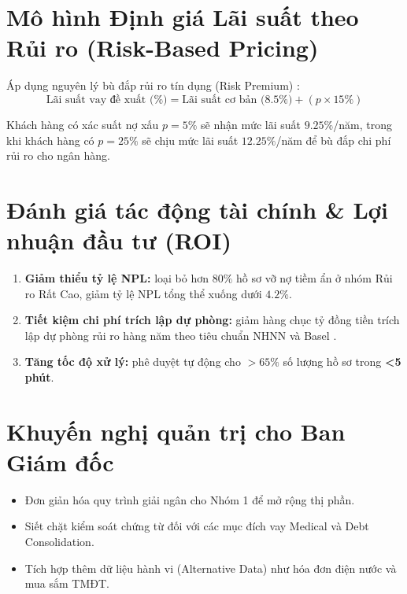 \section{Mô hình Định giá Lãi suất theo Rủi ro (Risk-Based Pricing)}
Áp dụng nguyên lý bù đắp rủi ro tín dụng (Risk Premium) \cite{arminger1997}:
$$\text{Lãi suất vay đề xuất (\%)} = \text{Lãi suất cơ bản (8.5\%)} + (p \times 15\%)$$

Khách hàng có xác suất nợ xấu $p = 5\%$ sẽ nhận mức lãi suất $9.25\%$/năm, trong khi khách hàng có $p = 25\%$ sẽ chịu mức lãi suất $12.25\%$/năm để bù đắp chi phí rủi ro cho ngân hàng.

\section{Đánh giá tác động tài chính \& Lợi nhuận đầu tư (ROI)}
\begin{enumerate}
    \item \textbf{Giảm thiểu tỷ lệ NPL:} loại bỏ hơn $80\%$ hồ sơ vỡ nợ tiềm ẩn ở nhóm Rủi ro Rất Cao, giảm tỷ lệ NPL tổng thể xuống dưới \textbf{$4.2\%$}.
    \item \textbf{Tiết kiệm chi phí trích lập dự phòng:} giảm hàng chục tỷ đồng tiền trích lập dự phòng rủi ro hàng năm theo tiêu chuẩn NHNN và Basel \cite{basel2017}.
    \item \textbf{Tăng tốc độ xử lý:} phê duyệt tự động cho $>65\%$ số lượng hồ sơ trong \textbf{<5 phút}.
\end{enumerate}

\section{Khuyến nghị quản trị cho Ban Giám đốc}
\begin{itemize}
    \item Đơn giản hóa quy trình giải ngân cho Nhóm 1 để mở rộng thị phần.
    \item Siết chặt kiểm soát chứng từ đối với các mục đích vay Medical và Debt Consolidation.
    \item Tích hợp thêm dữ liệu hành vi (Alternative Data) như hóa đơn điện nước và mua sắm TMĐT.
\end{itemize}
\newpage
